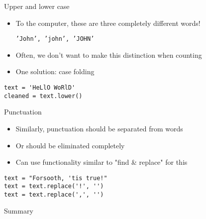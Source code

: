 \documentclass[aspectratio=169,usenames,dvipsnames]{beamer}
\begin{document}
\begin{frame}[fragile]{Upper and lower case}
    \begin{itemize}
        \item To the computer, these
            are three completely different words!

            \texttt{'John', 'john', 'JOHN'}
        \item Often, we don't want to make this distinction when counting
        \item One solution: case folding
    \end{itemize}
    \pause
\begin{lstlisting}
text = 'HeLlO WoRlD'
cleaned = text.lower()
\end{lstlisting}
\end{frame}

\begin{frame}[fragile]{Punctuation}
    \begin{itemize}
        \item Similarly, punctuation should be separated from words
        \item Or should be eliminated completely
        \item Can use functionality similar to "find \& replace" for this
    \end{itemize}
    \pause
\begin{lstlisting}
text = "Forsooth, 'tis true!"
text = text.replace('!', '')
text = text.replace(',', '')
\end{lstlisting}
\end{frame}


\begin{frame}{Summary}
\end{frame}


\end{document}
